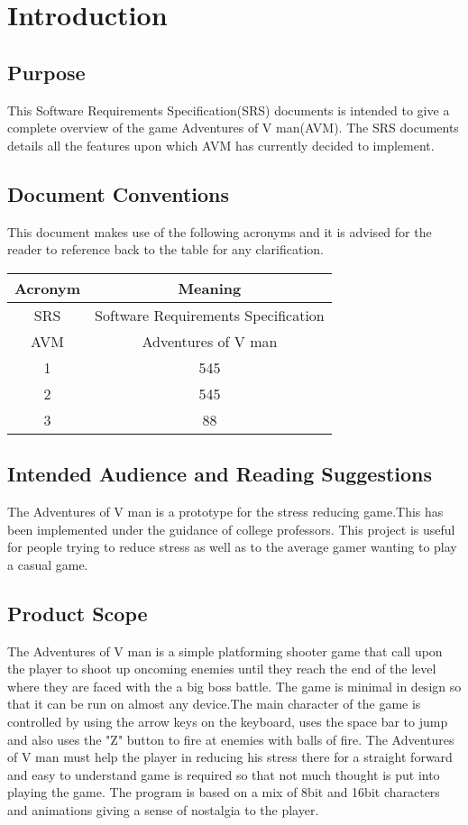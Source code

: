 \chapter{Introduction}
\label{ch:intro}

\section{Purpose}
This Software Requirements Specification(SRS) documents is intended to give a complete overview of the game Adventures of V man(AVM). The SRS documents details all the features upon which AVM has currently decided to implement.  
\section{Document Conventions}
This document makes use of the following acronyms and it is advised for the reader to reference back to the table for any clarification. 

\begin{center}
 \begin{tabular}{||c c||} 
 \hline
 Acronym & Meaning \\ [0.5ex] 
 \hline\hline
 SRS & Software Requirements Specification \\ 
 \hline
 AVM & Adventures of V man  \\
 \hline
 1 & 545 \\
 \hline
 2 & 545  \\
 \hline
 3 & 88  \\ [1ex] 
 \hline
\end{tabular}
\end{center}




\section{Intended Audience and Reading Suggestions}
The Adventures of V man is a prototype for the stress reducing game.This has been implemented under the guidance of college professors. This project is useful for people trying to reduce stress as well as to the average gamer wanting to play a casual game.


\section{Product Scope}
The Adventures of V man is a simple platforming shooter game that call upon the player to shoot up oncoming enemies until they reach the end of the level where they are faced with the a big boss battle.
The game is minimal in design so that it can be run on almost any device.The main character of the game is controlled by using the arrow keys on the keyboard, uses the space bar to jump and also uses the "Z" button to fire at enemies with balls of fire.
The Adventures of V man must help the player in reducing his stress there for a straight forward and easy to understand game is required so that not much thought is put into playing the game. The program is based on a mix of 8bit and 16bit characters and animations giving a sense of nostalgia to the player.


